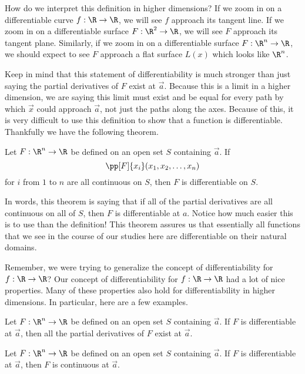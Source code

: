\documentclass{ximera}
\begin{document}
How do we interpret this definition in higher dimensions?  If we zoom
in on a differentiable curve $f:\R \to \R$, we will see $f$ approach
its tangent line. If we zoom in on a differentiable surface $F:\R^2
\to \R$, we will see $F$ approach its tangent plane.  Similarly, if we
zoom in on a differentiable surface $F:\R^n \to \R$, we should expect
to see $F$ approach a flat surface $L(x)$ which looks like $\R^n$.

Keep in mind that this statement of differentiability is much stronger
than just saying the partial derivatives of $F$ exist at $\vec{a}$.
Because this is a limit in a higher dimension, we are saying this
limit must exist and be equal for every path by which $\vec{x}$ could
approach $\vec{a}$, not just the paths along the axes.  Because of
this, it is very difficult to use this definition to show that a
function is differentiable.  Thankfully we have the following theorem.

\begin{theorem}
  Let $F:\R^n\to\R$ be defined on an open set $S$ containing
  $\vec{a}$.  If
  \[
  \pp[F]{x_i}(x_1, x_2, \dots, x_n)
  \]
 for $i$ from $1$ to $n$ are all continuous on $S$, then $F$ is differentiable on $S$.
\end{theorem}

In words, this theorem is saying that if all of the partial derivatives are all continuous on all of $S$, then $F$ is differentiable at $a$.  Notice how much easier this is to use than the definition! This theorem assures us that essentially all functions that we see in
the course of our studies here are differentiable on their natural domains.

Remember, we were trying to generalize the concept of differentiability for $f:\R \to \R$?  Our concept of differentiability for $f:\R \to \R$ had a lot of nice properties.  Many of these properties also hold for differentiability in higher dimensions.  In particular, here are a few examples.

\begin{theorem}
Let $F:\R^n\to\R$ be defined on an open set $S$ containing
$\vec{a}$.  If $F$ is differentiable at $\vec{a}$, then all the partial derivatives of $F$ exist at $\vec{a}$.
\end{theorem}

\begin{theorem}
Let $F:\R^n\to\R$ be defined on an open set $S$ containing
$\vec{a}$.  If $F$ is differentiable at $\vec{a}$, then $F$ is
continuous at $\vec{a}$.
\end{theorem}
\end{document}
